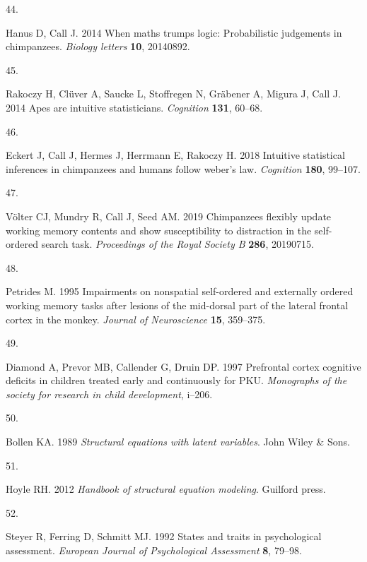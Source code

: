 \documentclass[
  man,floatsintext]{apa6}
\newlength{\cslhangindent}
\newlength{\csllabelwidth}
\newenvironment{CSLReferences}[2] %
 {\begin{list}{}{%
  \setlength{\itemindent}{0pt}
  \setlength{\leftmargin}{0pt}
  \setlength{\parsep}{0pt}
  \ifodd #1
   \setlength{\leftmargin}{\cslhangindent}
   \setlength{\itemindent}{-1\cslhangindent}
  \fi
  \setlength{\itemsep}{#2\baselineskip}}}
 {\end{list}}
\newcommand{\CSLLeftMargin}[1]{\parbox[t]{\csllabelwidth}{\strut#1\strut}}
\newcommand{\CSLRightInline}[1]{\parbox[t]{\linewidth - \csllabelwidth}{\strut#1\strut}}
\begin{document}
\begin{CSLReferences}{0}{1}
\CSLLeftMargin{44. }%
\CSLRightInline{Hanus D, Call J. 2014 When maths trumps logic: Probabilistic judgements in chimpanzees. \emph{Biology letters} \textbf{10}, 20140892.}

\CSLLeftMargin{45. }%
\CSLRightInline{Rakoczy H, Clüver A, Saucke L, Stoffregen N, Gräbener A, Migura J, Call J. 2014 Apes are intuitive statisticians. \emph{Cognition} \textbf{131}, 60--68.}

\CSLLeftMargin{46. }%
\CSLRightInline{Eckert J, Call J, Hermes J, Herrmann E, Rakoczy H. 2018 Intuitive statistical inferences in chimpanzees and humans follow weber's law. \emph{Cognition} \textbf{180}, 99--107.}

\CSLLeftMargin{47. }%
\CSLRightInline{Völter CJ, Mundry R, Call J, Seed AM. 2019 Chimpanzees flexibly update working memory contents and show susceptibility to distraction in the self-ordered search task. \emph{Proceedings of the Royal Society B} \textbf{286}, 20190715.}

\CSLLeftMargin{48. }%
\CSLRightInline{Petrides M. 1995 Impairments on nonspatial self-ordered and externally ordered working memory tasks after lesions of the mid-dorsal part of the lateral frontal cortex in the monkey. \emph{Journal of Neuroscience} \textbf{15}, 359--375.}

\CSLLeftMargin{49. }%
\CSLRightInline{Diamond A, Prevor MB, Callender G, Druin DP. 1997 Prefrontal cortex cognitive deficits in children treated early and continuously for PKU. \emph{Monographs of the society for research in child development}, i--206.}

\CSLLeftMargin{50. }%
\CSLRightInline{Bollen KA. 1989 \emph{Structural equations with latent variables}. John Wiley \& Sons. }

\CSLLeftMargin{51. }%
\CSLRightInline{Hoyle RH. 2012 \emph{Handbook of structural equation modeling}. Guilford press. }

\CSLLeftMargin{52. }%
\CSLRightInline{Steyer R, Ferring D, Schmitt MJ. 1992 States and traits in psychological assessment. \emph{European Journal of Psychological Assessment} \textbf{8}, 79--98.}


\end{CSLReferences}
\end{document}
